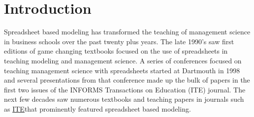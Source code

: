 \documentclass[ited,blindrev]{informs3}              %
\begin{document}
%


\section{Introduction}

Spreadsheet based modeling has transformed the teaching of management science in business schools over the past twenty plus years. The late 1990's saw first editions of game changing textbooks \cite{winstonPracticalManagementScience2018,ragsdaleSpreadsheetModelingDecision2017} focused on the use of spreadsheets in teaching modeling and management science.  A series of conferences focused on teaching management science with spreadsheets started at Dartmouth in 1998 and several presentations from that conference made up the bulk of papers in the first two issues of the INFORMS Transactions on Education (ITE) journal. The next few decades saw numerous textbooks \cite{powellBusinessAnalyticsArt, camm2020business} and teaching papers in journals such as \href{https://pubsonline.informs.org/journal/ited}{ITE}that prominently featured spreadsheet based modeling.
\end{document}
